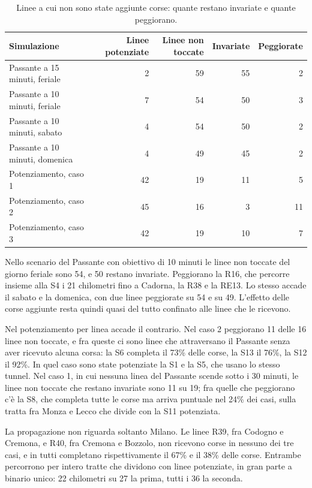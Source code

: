 \begin{table}[H]
	\centering
	\caption{Linee a cui non sono state aggiunte corse: quante restano invariate e quante peggiorano.}
	\label{tab:risultati-non-toccate}
	\begin{tabularx}{\textwidth}{Xrrrr}
		\toprule
		Simulazione & Linee potenziate & Linee non toccate & Invariate & Peggiorate \\
		\midrule
		Passante a 15 minuti, feriale & 2 & 59 & 55 & 2 \\
		Passante a 10 minuti, feriale & 7 & 54 & 50 & 3 \\
		Passante a 10 minuti, sabato & 4 & 54 & 50 & 2 \\
		Passante a 10 minuti, domenica & 4 & 49 & 45 & 2 \\
		Potenziamento, caso 1 & 42 & 19 & 11 & 5 \\
		Potenziamento, caso 2 & 45 & 16 & 3 & 11 \\
		Potenziamento, caso 3 & 42 & 19 & 10 & 7 \\
		\bottomrule
	\end{tabularx}
\end{table}

Nello scenario del Passante con obiettivo di 10 minuti le linee non toccate del giorno feriale sono 54, e 50 restano invariate. Peggiorano la R16, che percorre insieme alla S4 i 21 chilometri fino a Cadorna, la R38 e la RE13. Lo stesso accade il sabato e la domenica, con due linee peggiorate su 54 e su 49. L'effetto delle corse aggiunte resta quindi quasi del tutto confinato alle linee che le ricevono.

Nel potenziamento per linea accade il contrario. Nel caso 2 peggiorano 11 delle 16 linee non toccate, e fra queste ci sono linee che attraversano il Passante senza aver ricevuto alcuna corsa: la S6 completa il 73\% delle corse, la S13 il 76\%, la S12 il 92\%. In quel caso sono state potenziate la S1 e la S5, che usano lo stesso tunnel. Nel caso 1, in cui nessuna linea del Passante scende sotto i 30 minuti, le linee non toccate che restano invariate sono 11 su 19; fra quelle che peggiorano c'è la S8, che completa tutte le corse ma arriva puntuale nel 24\% dei casi, sulla tratta fra Monza e Lecco che divide con la S11 potenziata.

La propagazione non riguarda soltanto Milano. Le linee R39, fra Codogno e Cremona, e R40, fra Cremona e Bozzolo, non ricevono corse in nessuno dei tre casi, e in tutti completano rispettivamente il 67\% e il 38\% delle corse. Entrambe percorrono per intero tratte che dividono con linee potenziate, in gran parte a binario unico: 22 chilometri su 27 la prima, tutti i 36 la seconda.

